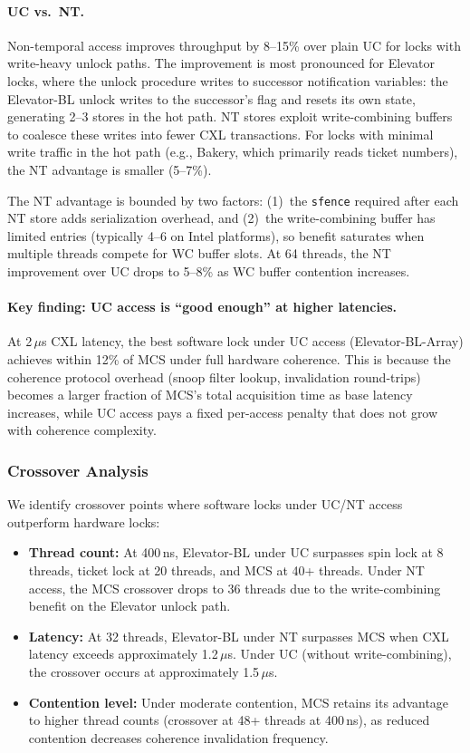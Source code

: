 \paragraph{UC vs.\ NT.}
Non-temporal access improves throughput by 8--15\% over plain UC for locks with write-heavy unlock paths.
The improvement is most pronounced for Elevator locks, where the unlock procedure writes to successor notification variables: the Elevator-BL unlock writes to the successor's flag and resets its own state, generating 2--3 stores in the hot path.
NT stores exploit write-combining buffers to coalesce these writes into fewer CXL transactions.
For locks with minimal write traffic in the hot path (e.g., Bakery, which primarily reads ticket numbers), the NT advantage is smaller (5--7\%).

The NT advantage is bounded by two factors:
(1)~the \texttt{sfence} required after each NT store adds serialization overhead, and
(2)~the write-combining buffer has limited entries (typically 4--6 on Intel platforms), so benefit saturates when multiple threads compete for WC buffer slots.
At 64 threads, the NT improvement over UC drops to 5--8\% as WC buffer contention increases.

\paragraph{Key finding: UC access is ``good enough'' at higher latencies.}
At 2\,$\mu$s CXL latency, the best software lock under UC access (Elevator-BL-Array) achieves within 12\% of MCS under full hardware coherence.
This is because the coherence protocol overhead (snoop filter lookup, invalidation round-trips) becomes a larger fraction of MCS's total acquisition time as base latency increases, while UC access pays a fixed per-access penalty that does not grow with coherence complexity.

\subsubsection{Crossover Analysis}

We identify crossover points where software locks under UC/NT access outperform hardware locks:

\begin{itemize}
    \item \textbf{Thread count:} At 400\,ns, Elevator-BL under UC surpasses spin lock at 8 threads, ticket lock at 20 threads, and MCS at 40+ threads.
    Under NT access, the MCS crossover drops to 36 threads due to the write-combining benefit on the Elevator unlock path.
    \item \textbf{Latency:} At 32 threads, Elevator-BL under NT surpasses MCS when CXL latency exceeds approximately 1.2\,$\mu$s.
    Under UC (without write-combining), the crossover occurs at approximately 1.5\,$\mu$s.
    \item \textbf{Contention level:} Under moderate contention, MCS retains its advantage to higher thread counts (crossover at 48+ threads at 400\,ns), as reduced contention decreases coherence invalidation frequency.
\end{itemize}

